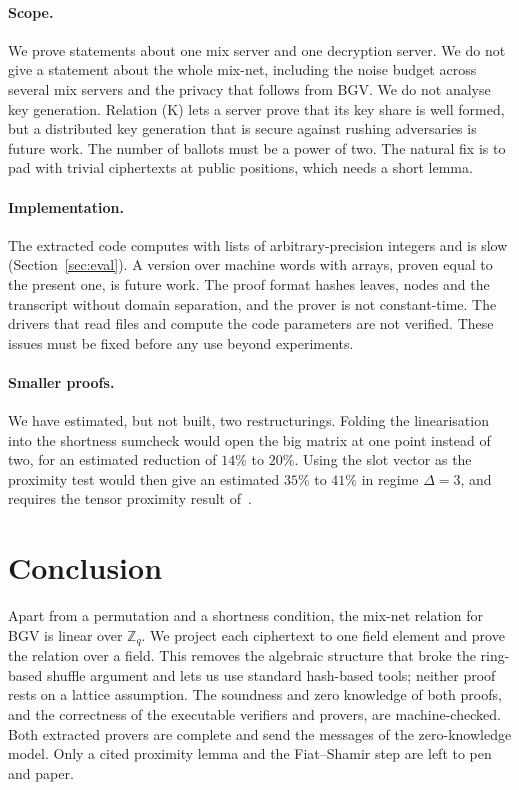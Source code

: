 \documentclass[sigconf,anonymous]{acmart}
\newcommand{\Zq}{\mathbb{Z}_q}
\begin{document}
\paragraph{Scope.}
We prove statements about one mix server and one decryption server. We do not give a statement about
the whole mix-net, including the noise budget across several mix servers and the privacy that follows
from BGV. We do not analyse key generation. Relation (K) lets a server prove that its key share is
well formed, but a distributed key generation that is secure against rushing adversaries is future
work. The number of ballots must be a power of two. The natural fix is to pad with trivial
ciphertexts at public positions, which needs a short lemma.

\paragraph{Implementation.}
The extracted code computes with lists of arbitrary-precision integers and is slow
(Section~\ref{sec:eval}). A version over machine words with arrays, proven equal to the present one,
is future work. The proof format hashes leaves, nodes and the transcript without domain separation,
and the prover is not constant-time. The drivers that read files and compute the code parameters are
not verified. These issues must be fixed before any use beyond experiments.

\paragraph{Smaller proofs.}
We have estimated, but not built, two restructurings. Folding the linearisation into the shortness
sumcheck would open the big matrix at one point instead of two, for an estimated reduction of $14\%$
to $20\%$. Using the slot vector as the proximity test would then give an estimated $35\%$ to $41\%$
in regime $\Delta=3$, and requires the tensor proximity result of~\cite{DP23}.

\section{Conclusion}

Apart from a permutation and a shortness condition, the mix-net relation for BGV is linear over
$\Zq$. We project each ciphertext to one field element and prove the relation over a field. This
removes the algebraic structure that broke the ring-based shuffle argument and lets us use standard
hash-based tools; neither proof rests on a lattice assumption. The soundness and zero knowledge of
both proofs, and the correctness of the executable verifiers and provers, are machine-checked. Both
extracted provers are complete and send the messages of the zero-knowledge model. Only a cited
proximity lemma and the Fiat--Shamir step are left to pen and paper.
\end{document}
